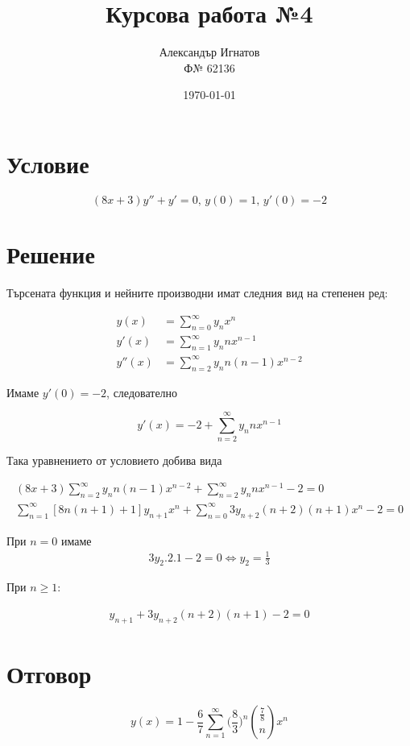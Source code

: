 \documentclass{article}
\title{Курсова работа №4}
\author{Александър Игнатов \\ Ф№ 62136 }
\date{\today}
\begin{document}
\maketitle

\section*{Условие}

\[
    (8x+3)y'' + y' = 0,\, y(0) = 1,\, y'(0) = -2
\]

\section*{Решение}

Търсената функция и нейните производни имат следния вид на степенен ред:

\begin{align*}
    y(x) &= \sum_{n=0}^{\infty} y_n x^n \\
    y'(x) &= \sum_{n=1}^{\infty} y_n n x^{n-1} \\
    y''(x) &= \sum_{n=2}^{\infty} y_n n(n-1) x^{n-2}
\end{align*}

Имаме \( y'(0) = -2 \), следователно

\[
    y'(x) = -2 + \sum_{n=2}^{\infty} y_n n x^{n-1}
\]

Така уравнението от условието добива вида

\begin{gather*}
    (8x+3)\sum_{n=2}^\infty y_n n(n-1)x^{n-2} + \sum_{n=2} ^\infty y_n n x^{n-1} - 2 = 0 \\
    \sum_{n=1}^\infty [8n(n+1) + 1]y_{n+1}x^n + \sum_{n=0}^\infty 3y_{n+2}(n+2)(n+1)x^n - 2 = 0
\end{gather*}

При \( n = 0 \) имаме
\begin{gather*}
    3y_2 . 2 . 1 - 2 = 0 \Longleftrightarrow y_2 = \frac{1}{3}
\end{gather*}

При \( n \geq 1 \):

\begin{gather*}
    [8n(n+1) + 1]y_{n+1} + 3y_{n+2}(n+2)(n+1) - 2 = 0
\end{gather*}

\section*{Отговор}

\[
    y(x) = 1 - \frac{6}{7}\sum_{n=1}^{\infty} \bigg(\frac{8}{3}\bigg)^n \binom{\frac{7}{8}}{n} x^n
\]
\end{document}
